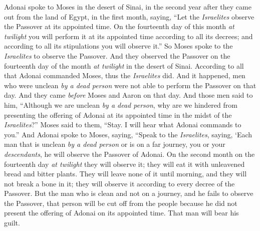 \begin{biblechapter} %
 Adonai spoke to Moses in the desert of Sinai, in the second year after they came out from the land of Egypt, in the first month, saying,
\verse “Let the \textit{Israelites} observe the Passover at its appointed time.
\verse On the fourteenth day of this month \textit{at twilight} you will perform it at its appointed time according to all its decrees; and according to all its stipulations you will observe it.”
\verse So Moses spoke to the \textit{Israelites} to observe the Passover.
\verse And they observed the Passover on the fourteenth day of the month \textit{at twilight} in the desert of Sinai. According to all that Adonai commanded Moses, thus the \textit{Israelites} did.
\verse And it happened, men who were unclean \textit{by a dead person} were not able to perform the Passover on that day. And they came \textit{before} Moses and Aaron on that day.
\verse And those men said to him, “Although we are unclean \textit{by a dead person}, why are we hindered from presenting the offering of Adonai at its appointed time in the midst of the \textit{Israelites}?”
\verse Moses said to them, “Stay. I will hear what Adonai commands to you.”
\verse And Adonai spoke to Moses, saying,
\verse “Speak to the \textit{Israelites}, saying, ‘Each man that is unclean \textit{by a dead person} or is on a far journey, you or your \textit{descendants}, he will observe the Passover of Adonai.
\verse On the second month on the fourteenth day \textit{at twilight} they will observe it; they will eat it with unleavened bread and bitter plants.
\verse They will leave none of it until morning, and they will not break a bone in it; they will observe it according to every decree of the Passover.
\verse But the man who is clean and not on a journey, and he fails to observe the Passover, that person will be cut off from the people because he did not present the offering of Adonai on its appointed time. That man will bear his guilt.

\end{biblechapter}

